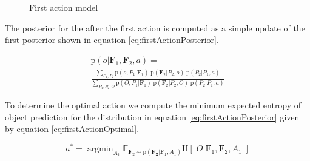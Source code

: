 \documentclass[conference]{IEEEtran}
\newcommand{\prob}[1]{\text{p}(#1)} %
\newcommand{\set}[1]{\mathbf{#1}} %
\DeclareMathOperator*{\argmin}{argmin}
\newcommand{\entropy}[1]{\text{H}\left[\;#1 \; \right]} %
\newcommand{\expectedValue}[2]{\hollow{E}_{#2}#1} %
\newcommand{\hollow}[1]{\mathbb{#1}} %
\begin{document}
        \begin{figure}[h]
          \centering
          \label{fig:firstActionGraph}
          \caption{First action model}
        \end{figure}

        The posterior for the after the first action is computed as a simple update of the first posterior shown in equation \ref{eq:firstActionPosterior}.

        \begin{multline}
          \label{eq:firstActionPosterior}
          \prob{o|\set{F}_1,\set{F}_2,a} = \\ \frac{\sum_{P_1,P_2} \prob{o,P_1|\set{F}_1} \; \prob{\set{F}_2|P_2,o} \; \prob{P_2|P_1,a}}{\sum_{P_1,P_2,O} \prob{O,P_1|\set{F}_1} \; \prob{\set{F}_2|P_2,O} \; \prob{P_2|P_1,a}}
        \end{multline}

        To determine the optimal action we compute the minimum expected entropy of object prediction for the distribution in equation \ref{eq:firstActionPosterior} given by equation \ref{eq:firstActionOptimal}.

        \begin{equation}
          \label{eq:firstActionOptimal}
          a^* = \argmin_{A_1} \expectedValue{\entropy{O|\set{F}_1,\set{F}_2,A_1}}{\set{F}_2 \sim \prob{\set{F_2}|\set{F}_1,A_1}}
        \end{equation}
\end{document}
